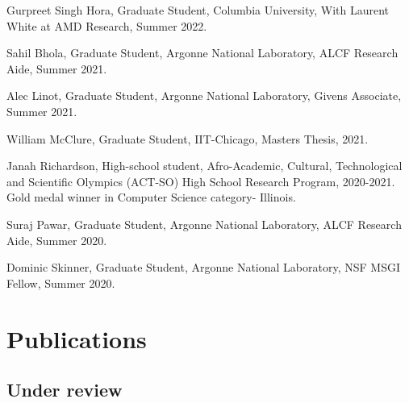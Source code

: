 \documentclass[letterpaper]{article}
\renewenvironment{itemize}{
  \begin{list}{}{
    \setlength{\leftmargin}{1.5em}
  }
}{
  \end{list}
}
\begin{document}
\begin{itemize}
  \item Gurpreet Singh Hora, Graduate Student, Columbia University, With Laurent White at AMD Research, Summer 2022.

  \item Sahil Bhola, Graduate Student, Argonne National Laboratory, ALCF Research Aide, Summer 2021.

  \item Alec Linot, Graduate Student, Argonne National Laboratory, Givens Associate, Summer 2021.

  \item William McClure, Graduate Student, IIT-Chicago, Masters Thesis, 2021. 

  \item Janah Richardson, High-school student, Afro-Academic, Cultural, Technological and Scientific Olympics (ACT-SO) High School Research Program, 2020-2021. Gold medal winner in Computer Science category- Illinois.

  \item Suraj Pawar, Graduate Student, Argonne National Laboratory, ALCF Research Aide, Summer 2020.

  \item Dominic Skinner, Graduate Student, Argonne National Laboratory, NSF MSGI Fellow, Summer 2020.

\end{itemize}


\section*{Publications}

\subsection*{Under review}
\end{document}
